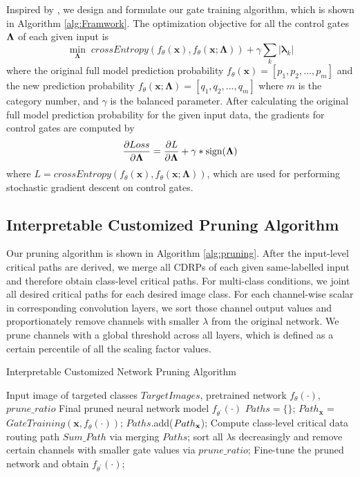 \documentclass[conference]{IEEEtran}
\begin{document}
Inspired by \cite{Wang_2018_CVPR}, we design and formulate our gate training algorithm, which is shown in Algorithm \ref{alg:Framwork}. The optimization objective for all the control gates $\bf \Lambda$ of each given input is
\begin{equation}
	\min_{\bm{\Lambda}} \; crossEntropy(f_{\theta}(\bm{x}),f_{\theta}(\bm{x};\bm{\Lambda}))+\gamma \sum_k |\bm{\lambda}_k|
\end{equation}
where the original full model prediction probability $f_{\theta}(\bm{x})=[p_1,p_2,...,p_m]$ and the new prediction probability $f_{\theta}(\bm{x};\bm{\Lambda}) = [q_1,q_2,...,q_m]$ where $m$ is the category number, and $\gamma$ is the balanced parameter. After calculating the original full model prediction probability for the given input data, the gradients for control gates are computed by
\begin{equation}
\frac{\partial Loss}{\partial \bm{\Lambda}} = 
\frac{\partial \textit L}{\partial \bm{\Lambda}}+ 
\gamma*\textup{sign}(\bm{\Lambda})
\end{equation} 
where $L=crossEntropy(f_{\theta}(\bm{x}),f_{\theta}(\bm{x};\bm{\Lambda}))$, which are used for performing stochastic gradient descent on control gates.

\subsection{Interpretable Customized Pruning Algorithm}
Our pruning algorithm is shown in Algorithm \ref{alg:pruning}. After the input-level critical paths are derived, we merge all CDRPs of each given same-labelled input and therefore obtain class-level critical paths. For multi-class conditions, we joint all desired critical paths for each desired image class. For each channel-wise scalar in corresponding convolution layers, we sort those channel output values and proportionately remove channels with smaller $\lambda$ from the original network.  We prune channels with a global threshold across all layers, which is defined as a certain percentile of all the scaling factor values.
\begin{algorithm}[htb!] 
	\caption{Interpretable Customized Network Pruning Algorithm} 
	\label{alg:pruning} 
	\begin{algorithmic}[1] 
		\Require 
			Input image of targeted classes $TargetImages$, pretrained network $f_\theta(\cdot)$, $prune\_ratio$
		\Ensure 
			Final pruned neural network model $f_{\theta^{'}}(\cdot)$
		\State $Paths=\{\}$;
			\State $Path_{\bm{x}}$ = $GateTraining(\bm{x},f_\theta(\cdot))$;
			\State $Paths$.add($Path_{\bf x}$);
		\EndFor
		\State Compute class-level critical data routing path $Sum\_Path$ via merging $Paths$;
			\State sort all $\lambda$s decreasingly and remove certain channels with smaller gate values via $prune\_ratio$;
		\EndFor
		\State Fine-tune the pruned network and obtain $f_{\theta^{'}}(\cdot)$;
	\end{algorithmic} 
\end{algorithm}
\end{document}
